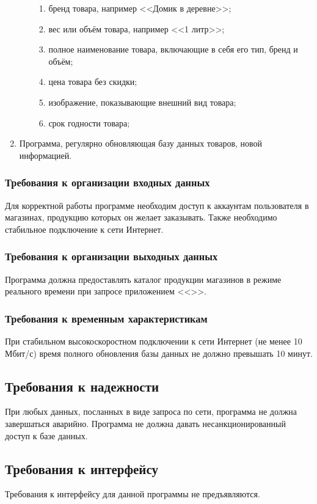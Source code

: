 \documentclass[a4paper,12pt,reqno]{article}
\begin{document}
\begin{enumerate}
\begin{enumerate}
\begin{enumerate}
        \item бренд товара, например <<Домик в деревне>>;
        \item вес или объём товара, например <<1 литр>>;
        \item полное наименование товара, включающие в себя его тип, бренд и объём;
        \item цена товара без скидки;
        \item изображение, показывающие внешний вид товара;
        \item срок годности товара;
      \end{enumerate}
    \end{enumerate}
    \item Программа, регулярно обновляющая базу данных товаров, новой информацией.
  \end{enumerate}

  \subsubsection{Требования к организации входных данных}
  Для корректной работы программе необходим доступ к аккаунтам пользователя в магазинах, продукцию которых он желает заказывать.
  Также необходимо стабильное подключение к сети Интернет.
  \subsubsection{Требования к организации выходных данных}
  Программа должна предоставлять каталог продукции магазинов в режиме реального времени при запросе приложением <<\CRTname>>.
  \subsubsection{Требования к временным характеристикам}
  При стабильном высокоскоростном подключении к сети Интернет (не менее 10 Мбит/с) время полного обновления базы данных
  не должно превышать 10 минут.
  \subsection{Требования к надежности}
  При любых данных, посланных в виде запроса по сети, программа не должна завершаться аварийно.
  Программа не должна давать несанкционированный доступ к базе данных.

  \subsection{Требования к интерфейсу}
  Требования к интерфейсу для данной программы не предъявляются.
\end{document}
